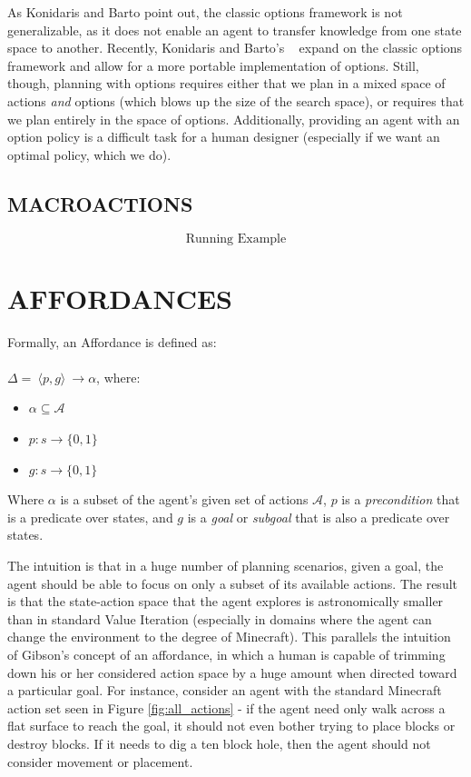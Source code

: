 \documentclass[]{article}
\begin{document}
As Konidaris and Barto point out, the classic options framework is not generalizable, as it does not enable an agent to transfer knowledge from one state space to another. Recently, Konidaris and Barto's ~\citep{konidaris07} expand on the classic options framework and allow for a more portable implementation of options. Still, though, planning with options requires either that we plan in a mixed space of actions {\it and} options (which blows up the size of the search space), or requires that we plan entirely in the space of options. Additionally, providing an agent with an option policy is a difficult task for a human designer (especially if we want an optimal policy, which we do).

\subsection{MACROACTIONS}

\[
\boxed{\text{Running Example}}
\]

\section{AFFORDANCES}

Formally, an Affordance is defined as: \\ \\
\vspace{1 mm} $\Delta =\ \langle p,g\rangle\ \longrightarrow \alpha$, where:

\begin{itemize}
\item[] $\alpha \subseteq \mathcal{A}$
\item[] $p : s \longrightarrow \{$0$, 1\}$
\item[] $g : s \longrightarrow \{$0$,1\}$
\end{itemize}

Where $\alpha$ is a subset of the agent's given set of actions $\mathcal{A}$, $p$ is a {\it precondition} that is a predicate over states, and $g$ is a {\it goal} or {\it subgoal} that is also a predicate over states.

The intuition is that in a huge number of planning scenarios, given a goal, the agent should be able to focus on only a subset of its available actions. The result is that the state-action space that the agent explores is astronomically smaller than in standard Value Iteration (especially in domains where the agent can change the environment to the degree of Minecraft). This parallels the intuition of Gibson's concept of an affordance, in which a human is capable of trimming down his or her considered action space by a huge amount when directed toward a particular goal. For instance, consider an agent with the standard Minecraft action set seen in Figure \ref{fig:all_actions} - if the agent need only walk across a flat surface to reach the goal, it should not even bother trying to place blocks or destroy blocks. If it needs to dig a ten block hole, then the agent should not consider movement or placement.
\end{document}

